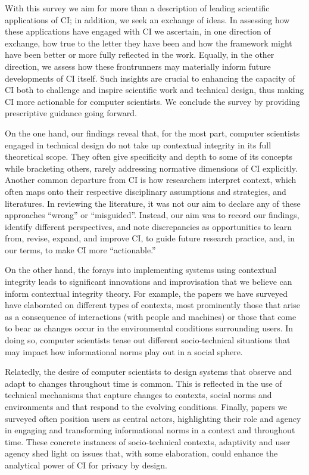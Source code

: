 \documentclass[../thesis.tex]{subfiles}
\begin{document}
With this survey we aim for more than a description of leading
scientific applications of CI; in addition, we seek an exchange of
ideas. In assessing how these applications have engaged with CI we
ascertain, in one direction of exchange, how true to the letter they
have been and how the framework might have been better or more fully
reflected in the work. Equally, in the other direction, we assess how
these frontrunners may materially inform future developments of CI
itself. Such insights are crucial to enhancing the capacity of CI both
to challenge and inspire scientific work and technical design, thus
making CI more actionable for computer scientists. We conclude the
survey by providing prescriptive guidance going forward.

On the one hand, our findings reveal that, for the most part, computer
scientists engaged in technical design do not take up contextual
integrity in its full theoretical scope. They often give specificity
and depth to some of its concepts while bracketing others, rarely
addressing normative dimensions of CI explicitly. Another common
departure from CI is how researchers interpret context, which often
maps onto their respective disciplinary assumptions and strategies, and
literatures. In reviewing the literature, it was not our aim to declare
any of these approaches ``wrong'' or
``misguided''. Instead, our aim was
to record our findings, identify different perspectives, and note
discrepancies as opportunities to learn from, revise, expand, and
improve CI, to guide future research practice, and, in our terms, to
make CI more ``actionable.''

On the other hand, the forays into implementing systems using contextual
integrity leads to significant innovations and improvisation that we
believe can inform contextual integrity theory.
For example, the papers
we have surveyed have elaborated on different types of contexts, most
prominently those that arise as a consequence of interactions (with
people and machines)
or those that come to bear as changes occur in the
environmental conditions surrounding users. In doing so, computer
scientists tease out different socio-technical situations that may
impact how informational norms play out in a social sphere.

Relatedly, the desire of computer scientists to design systems that
observe and adapt to changes throughout time is common. This is
reflected in the use of technical mechanisms that capture changes to
contexts, social norms and environments and that respond to the
evolving conditions. Finally, papers we surveyed often position users
as central actors, highlighting their role and agency in engaging and
transforming informational norms in a context and throughout time.
These concrete instances of socio-technical contexts, adaptivity and
user agency shed light on issues that, with some elaboration, could
enhance the analytical power of CI for privacy by design.
\end{document}
